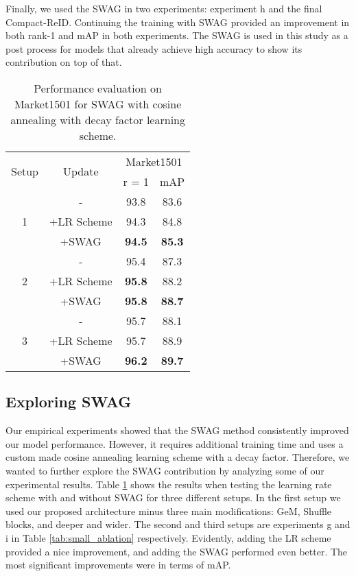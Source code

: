 \documentclass[sigconf]{acmart}
\begin{document}
Finally, we used the SWAG in two experiments: experiment h and the final Compact-ReID. Continuing the training with SWAG provided an improvement in both rank-1 and mAP in both experiments. The SWAG is used in this study as a post process for models that already achieve high accuracy to show its contribution on top of that.


\begin{table}\small
  \begin{center}
  \begin{tabular}{c|c|cc}
    	\multirow{2}{*}{Setup}	& \multirow{2}{*}{Update}	& \multicolumn{2}{c}{Market1501} 	 \\
   &  	& r = 1 	& mAP 	    \\
 	\hline
	\hline
\multirow{3}{*}{1} & - &93.8	&83.6		\\
& +LR Scheme  & 94.3 & 84.8       \\
& +SWAG &\textbf{94.5}	&\textbf{85.3}		\\
 	\hline
\multirow{3}{*}{2} & - &95.4	&87.3		\\
 & +LR Scheme &\textbf{95.8}& 88.2       \\
 & +SWAG &\textbf{95.8}	&\textbf{88.7}		\\
 	\hline
\multirow{3}{*}{3} & - &95.7	&88.1		\\
 & +LR Scheme  & 95.7 & 88.9       \\
 & +SWAG &\textbf{96.2}	&\textbf{89.7}		\\
\hline

  \end{tabular}
  \end{center}
    \caption{Performance evaluation on Market1501 for SWAG with cosine annealing with decay factor learning scheme.}
    \label{tab:SWAG}
\end{table}

\subsection{Exploring SWAG}
\label{sec:SWAG}
Our empirical experiments showed that the SWAG method consistently improved our model performance. However, it requires additional training time and uses a custom made cosine annealing learning scheme with a decay factor. Therefore, we wanted to further explore the SWAG contribution by analyzing some of our experimental results. Table \ref{tab:SWAG} shows the results when testing the learning rate scheme with and without SWAG for three different setups. In the first setup we used our proposed architecture minus three main modifications: GeM, Shuffle blocks, and deeper and wider. The second and third setups are experiments g and i in Table \ref{tab:small_ablation} respectively. Evidently, adding the LR scheme provided a nice improvement, and adding the SWAG performed even better. The most significant improvements were in terms of mAP.
\end{document}
